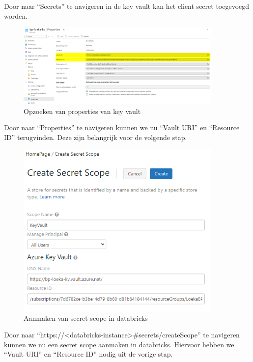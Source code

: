 Door naar ``Secrets'' te navigeren in de key vault kan het client secret toegevoegd worden.

\begin{figure}[H]
    \centering
    \includegraphics[width=0.9\textwidth]{./graphics/databricks/connection_13.png}
    \caption{Opzoeken van properties van key vault}
\end{figure}

Door naar ``Properties'' te navigeren kunnen we nu ``Vault URI'' en ``Resource ID'' terugvinden. Deze zijn belangrijk voor de volgende stap.

\begin{figure}[H]
    \centering
    \includegraphics[width=0.9\textwidth]{./graphics/databricks/connection_14.png}
    \caption{Aanmaken van secret scope in databricks}
\end{figure}

Door naar ``https://<databricks-instance>\#secrets/createScope'' te navigeren kunnen we nu een secret scope aanmaken in databricks. Hiervoor hebben we ``Vault URI'' en ``Resource ID'' nodig uit de vorige stap.

